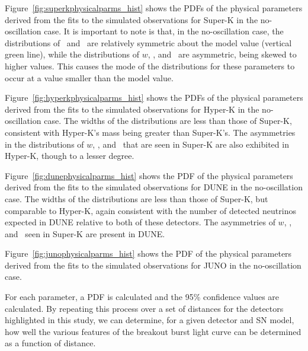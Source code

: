 
Figure~\ref{fig:superkphysicalparms_hist} shows the PDFs of the
physical parameters derived from the fits to the simulated
observations for Super-K in the no-oscillation case.  
It is important to
note is that, in the no-oscillation case, 
the distributions of \lmax\ and \tmax\ are relatively
symmetric about the model value (vertical green line), 
while the distributions of $w$, \trise, and \tfall\ are 
asymmetric, being skewed to higher values.  This causes the mode of the
distributions for these parameters to occur at a value
smaller than the model value.

Figure~\ref{fig:hyperkphysicalparms_hist} shows the PDFs of the
physical parameters derived from the fits to the simulated
observations for Hyper-K in the no-oscillation case.  
The widths of the distributions are less than 
those of Super-K, consistent with Hyper-K's mass being
greater than Super-K's.  The asymmetries in the
distributions of 
$w$, \trise, and \tfall\ that are seen in
Super-K are also exhibited in Hyper-K, though to a lesser degree.

Figure~\ref{fig:dunephysicalparms_hist} shows the PDF of the
physical parameters derived from the fits to the simulated
observations for DUNE in the no-oscillation case.  The widths of the
distributions are less than 
those of Super-K, but comparable to Hyper-K, again consistent with the number of
detected neutrinos expected in DUNE relative to both of these
detectors.  The asymmetries of $w$, \trise, and \tfall\ seen in
Super-K are present in DUNE.  

Figure~\ref{fig:junophysicalparms_hist} shows the PDF of the
physical parameters derived from the fits to the simulated
observations for JUNO in the no-oscillation case.  


For each parameter, a PDF is calculated and the 95\%
confidence values are calculated.  By repeating this process over a
set of distances for the detectors highlighted in this study, we can
determine, for a given detector and SN model, how well the various
features of the breakout burst light curve can be determined as a
function of distance.


